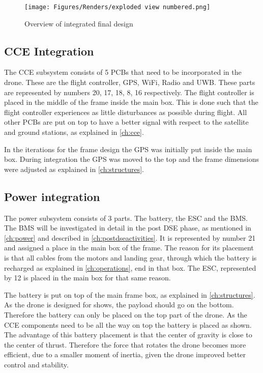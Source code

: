 \begin{figure}[H]
    \centering
    \texttt{[image: Figures/Renders/exploded view numbered.png]}
    \caption{Overview of integrated final design}
    \label{fig:exploded view}
\end{figure}

\subsection{CCE Integration}
The CCE subsystem consists of 5 PCBs that need to be incorporated in the drone. These are the flight controller, GPS, WiFi, Radio and UWB. These parts are represented by numbers 20, 17, 18, 8, 16 respectively. The flight controller is placed in the middle of the frame inside the main box. This is done such that the flight controller experiences as little disturbances as possible during flight. All other PCBs are put on top to have a better signal with respect to the satellite and ground stations, as explained in \autoref{ch:cce}. 

In the iterations for the frame design the GPS was initially put inside the main box. During integration the GPS was moved to the top and the frame dimensions were adjusted as explained in \autoref{ch:structures}.

\subsection{Power integration} \label{subsec:powerintegr}
The power subsystem consists of 3 parts. The battery, the ESC and the BMS. The BMS will be investigated in detail in the post DSE phase, as mentioned in \autoref{ch:power} and described in \autoref{ch:postdseactivities}. It is represented by number 21 and assigned a place in the main box of the frame. The reason for its placement is that all cables from the motors and landing gear, through which the battery is recharged as explained in \autoref{ch:operations}, end in that box. The ESC, represented by 12 is placed in the main box for that same reason.

The battery is put on top of the main frame box, as explained in \autoref{ch:structures}. As the drone is designed for shows, the payload should go on the bottom. Therefore the battery can only be placed on the top part of the drone. As the CCE components need to be all the way on top the battery is placed as shown. The advantage of this battery placement is that the center of gravity is close to the center of thrust. Therefore the force that rotates the drone becomes more efficient, due to a smaller moment of inertia, given the drone improved better control and stability.


